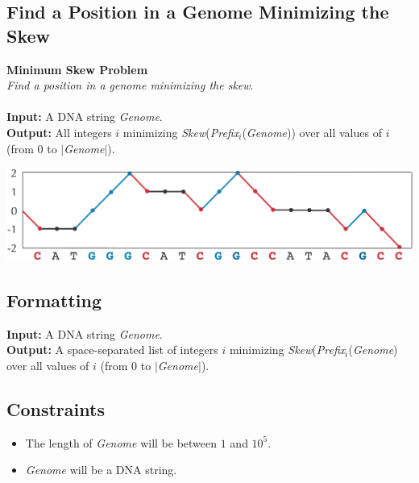 \documentclass{article}
\begin{document}
\subsection{Find a Position in a Genome Minimizing the Skew}
\hline\vspace{5}
\noindent \textbf{Minimum Skew Problem}\\
\emph{Find a position in a genome minimizing the skew}.\\ \\
\textbf{Input:} A DNA string \emph{Genome}.\\
\textbf{Output:} All integers $i$ minimizing \emph{Skew}(\emph{Prefix}$_i$(\emph{Genome})) over all values of $i$ (from 0 to $|$\emph{Genome}$|$).
\begin{center}
    \includegraphics[scale=0.12]{c1/logos/1F.png} 
\end{center}
\hline\vspace{5}

\subsection*{Formatting}
\textbf{Input:} A DNA string \emph{Genome}.\\
\noindent \textbf{Output:} A space-separated list of integers $i$ minimizing \emph{Skew}(\emph{Prefix}$_i$(\emph{Genome}) over all values of $i$ (from 0 to $|$\emph{Genome}$|$).

\subsection*{Constraints}
\begin{itemize}
    \item The length of \emph{Genome} will be between $1$ and $10^5$.
    \item \emph{Genome} will be a DNA string.
\end{itemize}
\pagebreak
\end{document}
